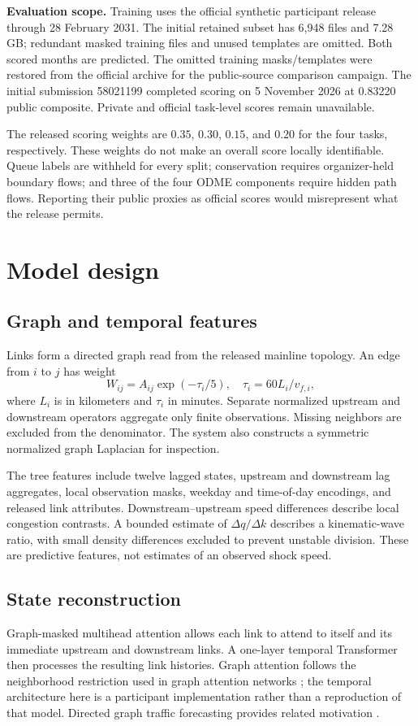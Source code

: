 \documentclass[conference]{IEEEtran}
\newcommand{\EventSubmission}{58021199}
\newcommand{\EventPublicScore}{0.83220}
\begin{document}
\textbf{Evaluation scope.} Training uses the official synthetic participant release through 28 February 2031. The initial retained subset has 6,948 files and 7.28 GB; redundant masked training files and unused templates are omitted. Both scored months are predicted. The omitted training masks/templates were restored from the official archive for the public-source comparison campaign. The initial submission \EventSubmission{} completed scoring on 5 November 2026 at \EventPublicScore{} public composite. Private and official task-level scores remain unavailable.

The released scoring weights are $0.35$, $0.30$, $0.15$, and $0.20$ for the
four tasks, respectively. These weights do not make an overall score locally
identifiable. Queue labels are withheld for every split; conservation requires
organizer-held boundary flows; and three of the four ODME components require
hidden path flows. Reporting their public proxies as official scores would
misrepresent what the release permits.

\section{Model design}
\subsection{Graph and temporal features}
Links form a directed graph read from the released mainline topology. An edge
from $i$ to $j$ has weight
\begin{equation}
 W_{ij}=A_{ij}\exp(-\tau_i/5),\quad
 \tau_i=60L_i/v_{f,i},
\end{equation}
where $L_i$ is in kilometers and $\tau_i$ in minutes. Separate normalized
upstream and downstream operators aggregate only finite observations. Missing
neighbors are excluded from the denominator. The system also constructs a
symmetric normalized graph Laplacian for inspection.

The tree features include twelve lagged states, upstream and downstream lag
aggregates, local observation masks, weekday and time-of-day encodings, and
released link attributes. Downstream--upstream speed differences describe local
congestion contrasts. A bounded estimate of $\Delta q/\Delta k$ describes a
kinematic-wave ratio, with small density differences excluded to prevent unstable
division. These are predictive features, not estimates of an observed shock speed.

\subsection{State reconstruction}
Graph-masked multihead attention allows each link to attend to itself and its
immediate upstream and downstream links. A one-layer temporal Transformer then
processes the resulting link histories. Graph attention follows the neighborhood
restriction used in graph attention networks \cite{gat}; the temporal architecture
here is a participant implementation rather than a reproduction of that model.
Directed graph traffic forecasting provides related motivation \cite{dcrnn}.
\end{document}
